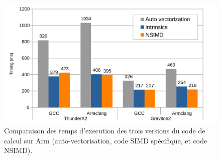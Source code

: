 \begin{figure}[!h]
  \centering
  \includegraphics[width=.6\textwidth]{img/timings.pdf}
  \caption{Comparaison des temps d'execution des trois versions du code de
    calcul sur Arm (auto-vectorisation, code SIMD spécifique, et code NSIMD).}
  \label{fig:timings}
\end{figure}
